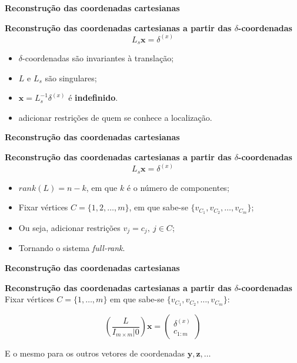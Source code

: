\begin{frame}{{\bf \color{blue} Reconstrução das coordenadas cartesianas}}

\begin{block}{\bf Reconstrução das coordenadas cartesianas a partir das $\delta$-coordenadas}
$$L_s \textbf{x} = \delta^{(x)}$$

\begin{itemize}
	\item $\delta$-coordenadas são invariantes à translação;
	\item $L$ e $L_s$ são singulares;
	\item $\textbf{x} = L_s^{-1} \delta^{(x)}$ é \textbf{indefinido}.
	\item {} adicionar restrições de quem se conhece a localização.
	
\end{itemize}
\end{block}
\end{frame}


\begin{frame}{{\bf \color{blue} Reconstrução das coordenadas cartesianas}}

\begin{block}{\bf Reconstrução das coordenadas cartesianas a partir das $\delta$-coordenadas}
$$L_s \textbf{x} = \delta^{(x)}$$

\begin{itemize}
	\item $rank(L) = n - k$, em que $k$ é o número de componentes;
	\item Fixar vértices $C = \{1, 2, \dots, m\}$, em que sabe-se $\{v_{C_1}, v_{C_2}, \dots, v_{C_m}\}$;
	\item Ou seja, adicionar restrições $v_{j} = c_j,\ j \in C$;
	\item Tornando o sistema \textit{full-rank}.
\end{itemize}	
\end{block}
\end{frame}


\begin{frame}{{\bf \color{blue} Reconstrução das coordenadas cartesianas}}

\begin{block}{\bf Reconstrução das coordenadas cartesianas a partir das $\delta$-coordenadas}
Fixar vértices $C = \{1, \dots, m\}$ em que sabe-se $\{v_{C_1}, v_{C_2}, \dots, v_{C_m}\}$:

\bigskip

$$\left(\frac{L}{I_{m\times m} | 0}\right) \textbf{x} = \begin{pmatrix}
\delta^{(x)} \\
c_{1:m}
\end{pmatrix}$$

\medskip

E o mesmo para os outros vetores de coordenadas $\mathbf{y, z, \dots}$
\end{block}
\end{frame}


